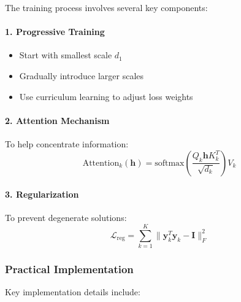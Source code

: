 The training process involves several key components:

\paragraph{1. Progressive Training}
\begin{itemize}
    \item Start with smallest scale $d_1$
    \item Gradually introduce larger scales
    \item Use curriculum learning to adjust loss weights
\end{itemize}

\paragraph{2. Attention Mechanism}
To help concentrate information:
\begin{equation}
    \text{Attention}_k(\mathbf{h}) = \text{softmax}(\frac{Q_k\mathbf{h}K_k^T}{\sqrt{d_k}})V_k
\end{equation}

\paragraph{3. Regularization}
To prevent degenerate solutions:
\begin{equation}
    \mathcal{L}_{\text{reg}} = \sum_{k=1}^K \|\mathbf{y}_k^T\mathbf{y}_k - \mathbf{I}\|_F^2
\end{equation}

\subsubsection{Practical Implementation}

Key implementation details include:

